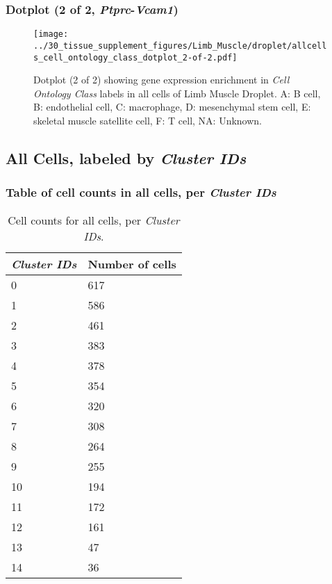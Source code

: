 \clearpage

\subsubsection{Dotplot (2 of 2, \emph{Ptprc}-\emph{Vcam1})}
\begin{figure}[h]
\centering
\texttt{[image: ../30\_tissue\_supplement\_figures/Limb\_Muscle/droplet/allcells\_cell\_ontology\_class\_dotplot\_2-of-2.pdf]}

\caption{ Dotplot (2 of 2)  showing gene expression enrichment in \emph{Cell Ontology Class} labels in all cells of Limb Muscle Droplet. A: B cell, B: endothelial cell, C: macrophage, D: mesenchymal stem cell, E: skeletal muscle satellite cell, F: T cell, NA: Unknown.}
\end{figure}


\clearpage

\subsection{All Cells, labeled by \emph{Cluster IDs}}
\subsubsection{Table of cell counts in all cells, per \emph{Cluster IDs}}\begin{table}[h]
\centering
\label{my-label}
\begin{tabular}{@{}ll@{}}
\toprule

\emph{Cluster IDs}& Number of cells \\ \midrule
0 & 617 \\

1 & 586 \\

2 & 461 \\

3 & 383 \\

4 & 378 \\

5 & 354 \\

6 & 320 \\

7 & 308 \\

8 & 264 \\

9 & 255 \\

10 & 194 \\

11 & 172 \\

12 & 161 \\

13 & 47 \\

14 & 36 \\
\bottomrule
\end{tabular}
\caption{Cell counts for all cells, per \emph{Cluster IDs}.}
\end{table}

